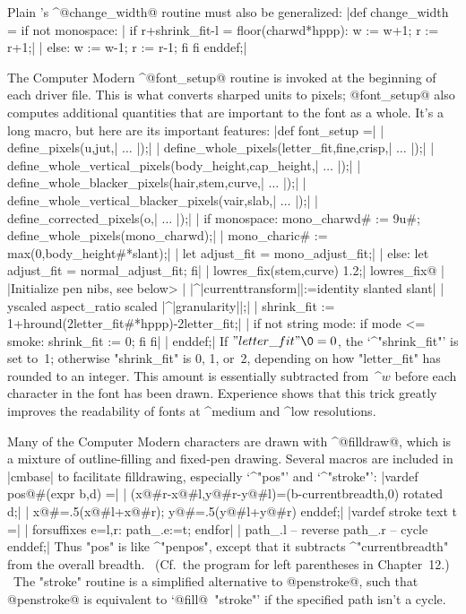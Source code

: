 \smallskip
Plain \MF's ^@change\_width@ routine must also be generalized:
\beginlines
|def change_width = if not monospace:           %
| if r+shrink_fit-l = floor(charwd*hppp): w := w+1; r := r+1;|
| else: w := w-1; r := r-1; fi fi enddef;|
\endlines

The Computer Modern ^@font\_setup@ routine is invoked at the beginning of
each driver file. This is what converts sharped units to pixels;
@font\_setup@ also computes additional quantities that are important to the
font as a whole. It's a long macro, but here are its important features:
\beginlines
|def font_setup =|
| define_pixels(u,jut,| $\ldots$ |);|
| define_whole_pixels(letter_fit,fine,crisp,| $\ldots$ |);|
| define_whole_vertical_pixels(body_height,cap_height,| $\ldots$ |);|
| define_whole_blacker_pixels(hair,stem,curve,| $\ldots$ |);|
| define_whole_vertical_blacker_pixels(vair,slab,| $\ldots$ |);|
| define_corrected_pixels(o,| $\ldots$ |);|
\smallbreak
| if monospace: mono_charwd# := 9u#; define_whole_pixels(mono_charwd);|
|  mono_charic# := max(0,body_height#*slant);|
|  let adjust_fit = mono_adjust_fit;|
| else: let adjust_fit = normal_adjust_fit; fi|
| lowres_fix(stem,curve) 1.2;|
^^@lowres\_fix@ \smallbreak
| |\<Initialize pen nibs, see below>
\smallbreak
| |^|currenttransform||:=identity slanted slant|
|  yscaled aspect_ratio scaled |^|granularity||;|
| shrink_fit := 1+hround(2letter_fit#*hppp)-2letter_fit;|
| if not string mode: if mode <= smoke: shrink_fit := 0; fi fi|
| enddef;|
\endlines
If $"letter\_fit"\0=0$, the `^"shrink\_fit"' is set to~1; otherwise
"shrink\_fit" is 0, 1, or~2, depending on how "letter\_fit" has
rounded to an integer. This amount is essentially subtracted from~^{$w$}
before each character in the font has been drawn. Experience shows that
this trick greatly improves the readability of fonts at ^{medium}
and ^{low resolutions}.

Many of the Computer Modern characters are drawn with ^@filldraw@, which
is a mixture of outline-filling and fixed-pen drawing. Several macros
are included in |cmbase| to facilitate filldrawing, especially
`^"pos"' and `^"stroke"':
\beginlines
|vardef pos@#(expr b,d) =|
| (x@#r-x@#l,y@#r-y@#l)=(b-currentbreadth,0) rotated d;|
| x@#=.5(x@#l+x@#r); y@#=.5(y@#l+y@#r) enddef;|
\smallbreak
|vardef stroke text t =|
| forsuffixes e=l,r: path_.e:=t; endfor|
| path_.l -- reverse path_.r -- cycle enddef;|
\endlines
Thus "pos" is like ^"penpos", except that it subtracts ^"currentbreadth"
from the overall breadth. \ (Cf.~the program for left parentheses in
Chapter~12.) \ The "stroke" routine is a simplified alternative to
@penstroke@, such that @penstroke@ is equivalent to `@fill@~"stroke"'
if the specified path isn't a cycle.

